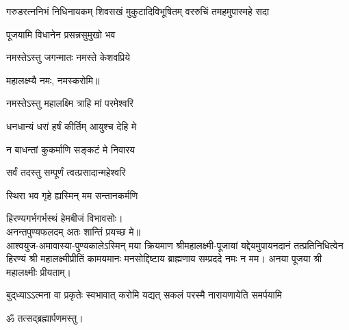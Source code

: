 
{गरुडरत्ननिभं निधिनायकम्}
{शिवसखं मुकुटादिविभूषितम्}
{वररुचिं तमहमुपास्महे सदा}

{पूजयामि विधानेन प्रसन्नसुमुखो भव}

\begingroup
\centering
\setlength{\columnseprule}{1pt}
\let\chapt\sect


\endgroup



{नमस्तेऽस्तु जगन्मातः नमस्ते केशवप्रिये}

महालक्ष्म्यै नमः, नमस्करोमि॥


{नमस्तेऽस्तु महालक्ष्मि त्राहि मां परमेश्वरि}

{धनधान्यं धरां हर्षं कीर्तिम् आयुश्च देहि मे}

{न बाधन्तां कुकर्माणि सङ्कटं मे निवारय}


{सर्वं तदस्तु सम्पूर्णं त्वत्प्रसादान्महेश्वरि}

{स्थिरा भव गृहे ह्यस्मिन् मम सन्तानकर्मणि}

हिरण्यगर्भगर्भस्थं हेमबीजं विभावसोः।\\
अनन्तपुण्यफलदम् अतः शान्तिं प्रयच्छ मे॥\\

आश्वयुज-अमावास्या-पुण्यकालेऽस्मिन् मया क्रियमाण श्री\-महा\-लक्ष्मी-पूजायां
यद्देयमुपायन\-दानं तत्प्रति\-निधित्वेन हिरण्यं श्री महा\-लक्ष्मी\-प्रीतिं
कामयमानः मनसोद्दिष्टाय ब्राह्मणाय सम्प्रददे नमः न मम। 
अनया पूजया श्री महालक्ष्मीः प्रीयताम्। 



{बुद्‌ध्याऽऽत्मना वा प्रकृतेः स्वभावात्}
{करोमि यद्यत् सकलं परस्मै}
{नारायणायेति समर्पयामि}

ॐ तत्सद्ब्रह्मार्पणमस्तु।